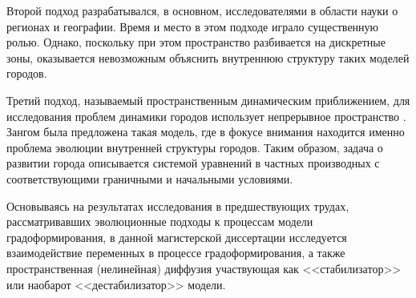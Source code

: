 Второй подход разрабатывался, в основном, исследователями в области науки о регионах и географии. Время и место в этом подходе играло существенную ролью. Однако, поскольку при этом пространство разбивается на дискретные зоны, оказывается невозможным объяснить внутреннюю структуру таких моделей городов.

Третий подход, называемый пространственным динамическим приближением, для исследования проблем динамики городов использует непрерывное пространство \cite[Занг,][]{zhang1991}. Зангом была предложена такая модель, где в фокусе внимания находится именно проблема эволюции внутренней структуры городов. Таким образом, задача о развитии города описывается системой уравнений в частных производных с соответствующими граничными и начальными условиями. 

Основываясь на результатах исследования в предшествующих трудах, рассматривавших эволюционные подходы к процессам модели градоформирования, в данной магистерской диссертации исследуется взаимодействие переменных в процессе градоформирования, а также пространственная (нелинейная) диффузия участвующая как <<стабилизатор>> или наобарот <<дестабилизатор>> модели.
